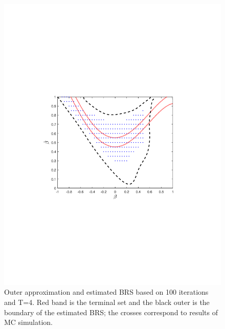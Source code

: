 \begin{figure}[!t]
  \includegraphics[trim=1.5in 3.3in 1.5in 3.5in, clip=true,width=\columnwidth]{figures/rw_0p1_4_new}
  \caption{Outer approximation and estimated BRS based on 100 iterations and T=4. Red band is the terminal set and the black outer is the boundary of the estimated BRS; the crosses correspond to results of MC simulation.}
  \label{fig:rw_brs}
\end{figure}
